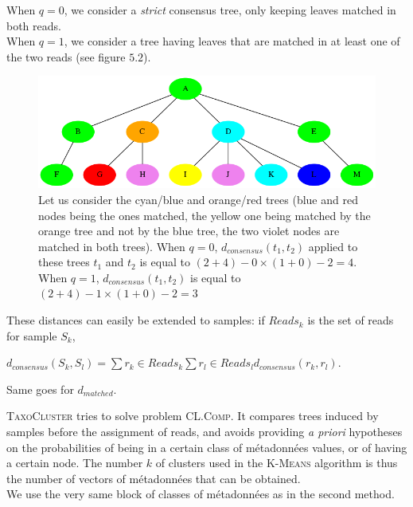 \documentclass{beamer}
\begin{document}
\begin{frame}
\begin{itemize}
When $q = 0$, we consider a \emph{strict} consensus tree, only keeping leaves matched in both reads.\\
When $q = 1$, we consider a tree having leaves that are matched in at least one of the two reads (see figure $5.2$).

\begin{figure}[H]
\centering
\includegraphics[scale=0.45]{illustrations/distance2.png}
\caption{Let us consider the cyan/blue and orange/red trees (blue and red nodes being the ones matched, the yellow one being matched by the orange tree and not by the blue tree, the two violet nodes are matched in both trees). When $q = 0$, $d_{consensus}(t_{1},t_{2})$ applied to these trees $t_{1}$ and $t_{2}$ is equal to $(2 + 4) - 0 \times (1 + 0) - 2 = 4$. When $q = 1$, $d_{consensus}(t_{1},t_{2})$ is equal to $(2 + 4) - 1 \times (1 + 0) - 2 = 3$}
\end{figure}

       \end{itemize}
\item These distances can easily be extended to samples: if $Reads_{k}$ is the set of reads for sample $S_{k}$,\\
\begin{center}
$d_{consensus}(S_{k},S_{l}) = \sum{r_{k} \in Reads_{k}}{\sum{r_{l} \in Reads_{l}}{d_{consensus}(r_{k},r_{l})}}$.
\end{center} 

Same goes for $d_{matched}$.

\textsc{TaxoCluster} tries to solve problem \textsc{CL.Comp}. It compares trees induced by samples before the assignment of reads, and avoids providing \emph{a priori} hypotheses on the probabilities of being in a certain class of métadonnées values, or of having a certain node. The number $k$ of clusters used in the \textsc{K-Means} algorithm is thus the number of vectors of métadonnées that can be obtained.\\

We use the very same block of classes of métadonnées as in the second method.


\end{frame}
\end{document}
